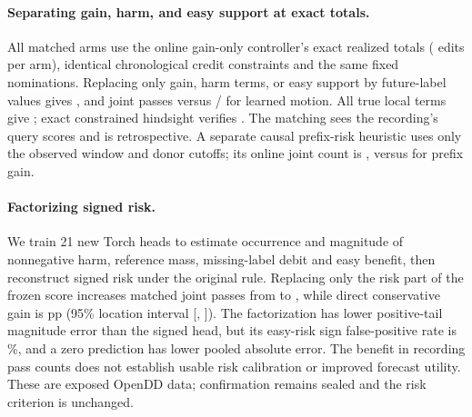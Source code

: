 \paragraph{Separating gain, harm, and easy support at exact totals.}
All matched arms use the online gain-only controller's exact realized
totals (\FactorRiskEdits{} edits per arm), identical chronological
credit constraints and the same fixed nominations. Replacing only
gain, harm terms, or easy support by future-label values gives
\FactorRiskGain{}, \FactorRiskRisk{} and \FactorRiskSupport{} joint
passes versus \FactorRiskBase{}/\FactorRiskViews{} for learned motion.
All true local terms give \FactorRiskAll{}; exact constrained hindsight
verifies \FactorRiskGlobal{}. The matching sees the recording's query
scores and is retrospective. A separate causal prefix-risk heuristic
uses only the observed window and donor cutoffs; its online joint count
is \FactorRiskPrefixRisk{}, versus \FactorRiskPrefix{} for prefix gain.

\paragraph{Factorizing signed risk.}
We train 21 new Torch heads to estimate occurrence and magnitude of
nonnegative harm, reference mass, missing-label debit and easy benefit,
then reconstruct signed risk under the original rule. Replacing only
the risk part of the frozen score increases matched joint passes from
\FactorRiskBase{} to \FactorRiskFactor{}, while direct conservative gain
is \FactorRiskPoint{} pp (95\% location interval
[\FactorRiskLow{}, \FactorRiskHigh{}]). The factorization has lower
positive-tail magnitude error than the signed head, but its easy-risk
sign false-positive rate is \FactorRiskFalsePositive{}\%, and a zero
prediction has lower pooled absolute error. The benefit in recording
pass counts does not establish usable risk calibration or improved
forecast utility. These are exposed OpenDD data; confirmation remains
sealed and the risk criterion is unchanged.
